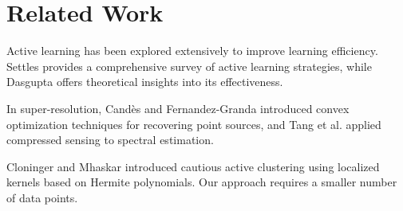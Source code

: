 \section{Related Work}
Active learning has been explored extensively to improve learning efficiency. Settles \cite{settles2009active} provides a comprehensive survey of active learning strategies, while Dasgupta \cite{dasgupta2011two} offers theoretical insights into its effectiveness.

In super-resolution, Candès and Fernandez-Granda \cite{candes2014towards} introduced convex optimization techniques for recovering point sources, and Tang et al. \cite{tang2013compressed} applied compressed sensing to spectral estimation.


Cloninger and Mhaskar \cite{cloninger2020cautious} introduced cautious active clustering using localized kernels based on Hermite polynomials.
Our approach requires a smaller number of data points.